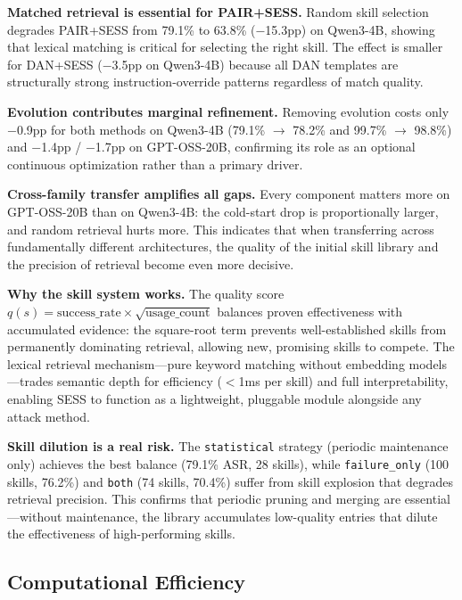 \documentclass[letterpaper]{article}
\begin{document}
\textbf{Matched retrieval is essential for PAIR+SESS.} Random skill selection degrades PAIR+SESS from 79.1\% to 63.8\% ($-$15.3pp) on Qwen3-4B, showing that lexical matching is critical for selecting the right skill. The effect is smaller for DAN+SESS ($-$3.5pp on Qwen3-4B) because all DAN templates are structurally strong instruction-override patterns regardless of match quality.

\textbf{Evolution contributes marginal refinement.} Removing evolution costs only $-$0.9pp for both methods on Qwen3-4B (79.1\% $\to$ 78.2\% and 99.7\% $\to$ 98.8\%) and $-$1.4pp / $-$1.7pp on GPT-OSS-20B, confirming its role as an optional continuous optimization rather than a primary driver.

\textbf{Cross-family transfer amplifies all gaps.} Every component matters more on GPT-OSS-20B than on Qwen3-4B: the cold-start drop is proportionally larger, and random retrieval hurts more. This indicates that when transferring across fundamentally different architectures, the quality of the initial skill library and the precision of retrieval become even more decisive.

\textbf{Why the skill system works.} The quality score $q(s) = \text{success\_rate} \times \sqrt{\text{usage\_count}}$ balances proven effectiveness with accumulated evidence: the square-root term prevents well-established skills from permanently dominating retrieval, allowing new, promising skills to compete. The lexical retrieval mechanism---pure keyword matching without embedding models---trades semantic depth for efficiency ($<$1ms per skill) and full interpretability, enabling SESS to function as a lightweight, pluggable module alongside any attack method.

\textbf{Skill dilution is a real risk.} The \texttt{statistical} strategy (periodic maintenance only) achieves the best balance (79.1\% ASR, 28 skills), while \texttt{failure\_only} (100 skills, 76.2\%) and \texttt{both} (74 skills, 70.4\%) suffer from skill explosion that degrades retrieval precision. This confirms that periodic pruning and merging are essential---without maintenance, the library accumulates low-quality entries that dilute the effectiveness of high-performing skills.

\subsection{Computational Efficiency}
\end{document}

